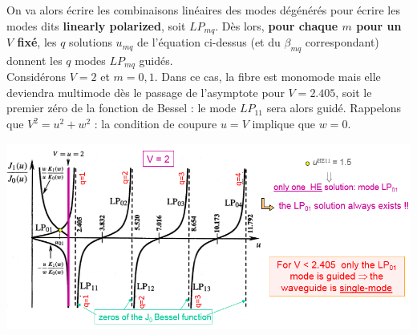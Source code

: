 On va alors écrire les combinaisons linéaires des modes dégénérés pour écrire les modes dits \textbf{
linearly polarized}, soit $LP_{mq}$. Dès lors, \textbf{pour chaque $m$ pour un $V$ fixé}, les $q$ 
solutions $u_{mq}$ de l'équation ci-dessus (et du $\beta_{mq}$ correspondant) donnent les $q$ 
modes $LP_{mq}$ guidés.\\

Considérons $V=2$ et $m=0,1$. Dans ce cas, la fibre est monomode mais elle deviendra multimode dès
le passage de l'asymptote pour $V=2.405$, soit le premier zéro de la fonction de Bessel : le mode
$LP_{11}$ sera alors guidé. Rappelons que $V^2=u^2+w^2$ : la condition de coupure $u=V$ implique que
$w=0$.

\begin{center}
	\includegraphics[scale=0.64]{ch1/image22.png}
\end{center}


